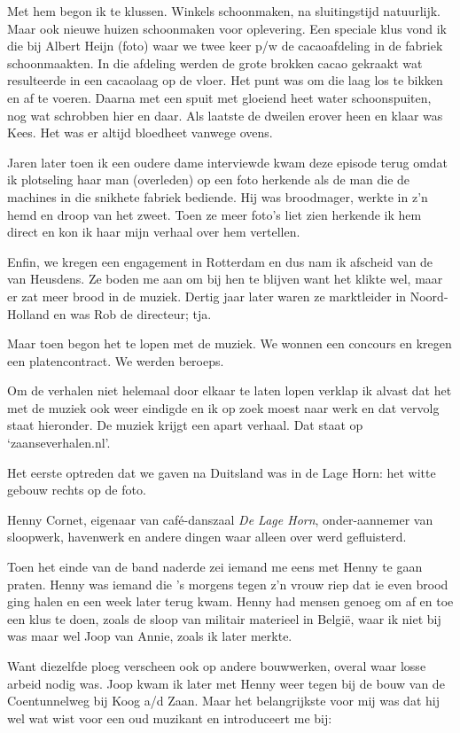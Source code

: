 \documentclass[10pt,twoside,openright]{memoir}
\begin{document}
Met hem begon ik te klussen. Winkels schoonmaken, na sluitingstijd natuurlijk. Maar ook nieuwe huizen schoonmaken voor oplevering. Een speciale klus vond ik die bij Albert Heijn (foto) waar we twee keer p/w de cacaoafdeling in de fabriek schoonmaakten. In die afdeling werden de grote brokken cacao gekraakt wat resulteerde in een cacaolaag op de vloer. Het punt was om die laag los te bikken en af te voeren. Daarna met een spuit met gloeiend heet water schoonspuiten, nog wat schrobben hier en daar. Als laatste de dweilen erover heen en klaar was Kees. Het was er altijd bloedheet vanwege ovens. 

Jaren later toen ik een oudere dame interviewde kwam deze episode terug omdat ik plotseling haar man (overleden) op een foto herkende als de man die de machines in die snikhete fabriek bediende. Hij was broodmager, werkte in z’n hemd en droop van het zweet. Toen ze meer foto’s liet zien herkende ik hem direct en kon ik haar mijn verhaal over hem vertellen.

Enfin, we kregen een engagement in Rotterdam en dus nam ik afscheid van de van Heusdens. Ze boden me aan om bij hen te blijven want het klikte wel, maar er zat meer brood in de muziek. Dertig jaar later waren ze marktleider in Noord-Holland en was Rob de directeur; tja.

Maar toen begon het te lopen met de muziek. We wonnen een concours en kregen een platencontract. We werden beroeps. 

Om de verhalen niet helemaal door elkaar te laten lopen verklap ik alvast dat het met de muziek ook weer eindigde en ik op zoek moest naar werk en dat vervolg staat hieronder. De muziek krijgt een apart verhaal. Dat staat op ‘zaanseverhalen.nl’.

Het eerste optreden dat we gaven na Duitsland was in de Lage Horn: het witte gebouw rechts op de foto. 

Henny Cornet, eigenaar van café-danszaal \emph{De Lage Horn}, onder-aannemer van sloopwerk, havenwerk en andere dingen waar alleen over werd gefluisterd. 

Toen het einde van de band naderde zei iemand me eens met Henny te gaan praten. Henny was iemand die ’s morgens tegen z’n vrouw riep dat ie even brood ging halen en een week later terug kwam. Henny had mensen genoeg om af en toe een klus te doen, zoals de sloop van militair materieel in België, waar ik niet bij was maar wel Joop van Annie, zoals ik later merkte. 

Want diezelfde ploeg verscheen ook op andere bouwwerken, overal waar losse arbeid nodig was. Joop kwam ik later met Henny weer tegen bij de bouw van de Coentunnelweg bij Koog a/d Zaan. Maar het belangrijkste voor mij was dat hij wel wat wist voor een oud muzikant en introduceert me bij: 
\end{document}

